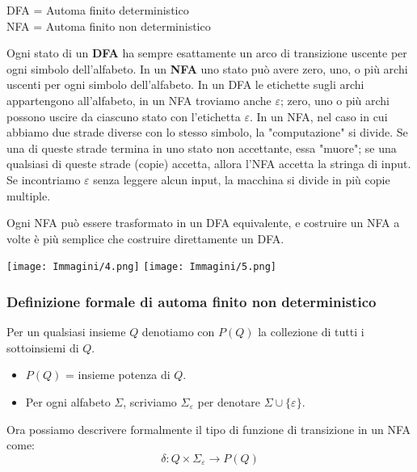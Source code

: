 \documentclass{article}
\begin{document}
\begin{tcolorbox}[title=Nota]
    DFA = Automa finito deterministico\\
    NFA = Automa finito non deterministico
\end{tcolorbox}

Ogni stato di un \textbf{DFA} ha sempre esattamente un arco di transizione uscente per ogni simbolo dell'alfabeto.
In un \textbf{NFA} uno stato può avere zero, uno, o più archi uscenti per ogni simbolo dell'alfabeto.
In un DFA le etichette sugli archi appartengono all'alfabeto, in un NFA troviamo anche $\varepsilon$; zero, uno o più archi possono uscire da ciascuno stato con l'etichetta $\varepsilon$.
In un NFA, nel caso in cui abbiamo due strade diverse con lo stesso simbolo, la "computazione" si divide.
Se una di queste strade termina in uno stato non accettante, essa "muore"; se una qualsiasi di queste strade (copie) accetta, allora l'NFA accetta la stringa di input.
Se incontriamo $\varepsilon$ senza leggere alcun input, la macchina si divide in più copie multiple.

\begin{tcolorbox}[title=Importante]
    Ogni NFA può essere trasformato in un DFA equivalente, e costruire un NFA a volte è più semplice che costruire direttamente un DFA.
\end{tcolorbox}

\begin{center}
    \texttt{[image: Immagini/4.png]}
    \texttt{[image: Immagini/5.png]}
\end{center}

\subsubsection{Definizione formale di automa finito non deterministico}

Per un qualsiasi insieme $Q$ denotiamo con $P(Q)$ la collezione di tutti i sottoinsiemi di $Q$.
    \begin{itemize}
        \item $P(Q)$ = \textcolor{myred}{insieme potenza} di $Q$.
        \item Per ogni alfabeto $\Sigma$, scriviamo $\Sigma_\varepsilon$ per denotare $\Sigma \cup \{\varepsilon\}$.
    \end{itemize}

Ora possiamo descrivere formalmente il tipo di funzione di transizione in un NFA come:
\[
\delta:Q\times\Sigma_\varepsilon\rightarrow P(Q)
\]
\vspace{3em}
\end{document}

